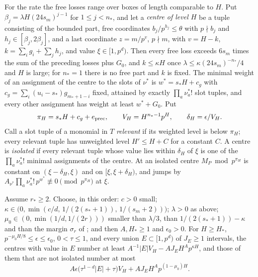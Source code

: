 \documentclass[11pt]{article}
\begin{document}
For the rate the free losses range over boxes of length comparable to $H$. Put $\beta_j=\lambda H(24s_m)^{j-1}$
for $1\le j<n_*$, and let a \emph{centre of level $H$} be a tuple consisting of the bounded part, free
coordinates $b_j/p^{h_j}\le\theta$ with $p\nmid b_j$ and $h_j\in[\beta_j,2\beta_j]$, and a last coordinate $z=m/p^v$,
$p\nmid m$, with $v=H-k$, $k=\sum_ig_i+\sum_jh_j$, and value $\xi\in[1,p^d)$. Then every free loss exceeds $6s_m$
times the sum of the preceding losses plus $G_0$, and $k\le\kappa H$ once $\lambda\le\kappa(24s_m)^{-n_*}/4$ and $H$
is large; for $n_*=1$ there is no free part and $k$ is fixed. The minimal weight of an assignment of the
centre to the slots of $\nu^*$ is $w^*=s_*H+c_g$ with $c_g=\sum_i(u_i-s_*)g_{m_*+1-i}$ fixed, attained by exactly
$\prod_a\nu^*_a!$ slot tuples, and every other assignment has weight at least $w^*+G_0$. Put
\[
\pi_H=s_*H+c_g+e_{\rm prec},\qquad V_H=H^{n_*-1}p^H,\qquad \delta_H=\epsilon/V_H .
\]
Call a slot tuple of a monomial in $T$ \emph{relevant} if its weighted level is below $\pi_H$; every relevant
tuple has unweighted level $H'\le H+C$ for a constant $C$. A centre is \emph{isolated} if every relevant tuple
whose value lies within $\delta_H$ of $\xi$ is one of the $\prod_a\nu^*_a!$ minimal assignments of the centre. At an
isolated centre $M_P\bmod p^{\pi_H}$ is constant on $(\xi-\delta_H,\xi)$ and on $[\xi,\xi+\delta_H)$, and jumps by
$A_{\nu^*}\prod_a\nu^*_a!\,p^{w^*}\not\equiv0\pmod{p^{\pi_H}}$ at $\xi$.

\begin{lemma}\label{lem:wiso}
Assume $r_*\ge2$. Choose, in this order: $c>0$ small; $\kappa\in\bigl(0,\min(c/d,\,1/(2(s_*+1)),\,1/(s_m+2))\bigr)$;
$\lambda>0$ as above; $\mu_0\in(0,\min(1/d,1/(2r)))$ smaller than $\lambda/3$, than $1/(2(s_*+1))-\kappa$ and than
the margin $\sigma_r$ of ; and then $A,H_*\ge1$ and $\epsilon_0>0$. For $H\ge H_*$,
$p^{-\mu_0H/8}\le\epsilon\le\epsilon_0$, $0<\tau\le1$, and every union $E\subset[1,p^d)$ of $J_E\ge1$ intervals, the
centres with value in $E$ number at least $A^{-1}|E|V_H-AJ_EH^Ap^{\kappa H}$, and those of them that are not
isolated number at most
\[
A\epsilon\bigl(\tau^{1-d}|E|+\tau\bigr)V_H+AJ_EH^Ap^{(1-\mu_0)H}.
\]
\end{lemma}
\end{document}
